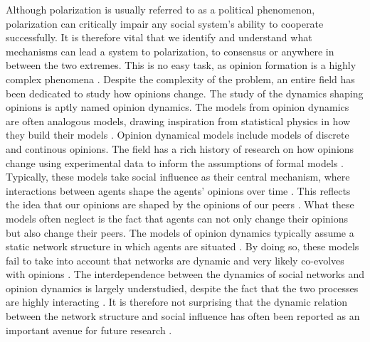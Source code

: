 \documentclass{article}
\begin{document}
Although polarization is usually referred to as a political phenomenon, polarization can critically impair any social system's ability to cooperate successfully. It is therefore vital that we identify and understand what mechanisms can lead a system to polarization, to consensus or anywhere in between the two extremes. This is no easy task, as opinion formation is a highly complex phenomena \cite{baumann_modeling_2021}. 
Despite the complexity of the problem, an entire field has been dedicated to study how opinions change. The study of the dynamics shaping opinions is aptly named opinion dynamics. The models from opinion dynamics are often analogous models, drawing inspiration from statistical physics in how they build their models \cite{galesic_integrating_2021}. Opinion dynamical models include models of discrete and continous opinions. The field has a rich history of research on how opinions change using experimental data to inform the assumptions of formal models \cite{baumann_modeling_2021,chacoma_opinion_2015,flache_models_2017,friedkin_social_1990,noorazar_classical_2020,spears_social_2021,turner_paths_2018}. Typically, these models take social influence as their central mechanism, where interactions between agents shape the agents’ opinions over time \cite{flache_models_2017}. 
This reflects the idea that our opinions are shaped by the opinions of our peers \cite{mcpherson_birds_2001}. What these models often neglect is the fact that agents can not only change their opinions but also change their peers. The models of opinion dynamics typically assume a static network structure in which agents are situated \cite{galesic_integrating_2021}. By doing so, these models fail to take into account that networks are dynamic and very likely co-evolves with opinions \cite{ferraz_de_arruda_modelling_2022,galesic_integrating_2021}. The interdependence between the dynamics of social networks and opinion dynamics is largely understudied, despite the fact that the two processes are highly interacting \cite{asikainen_cumulative_2020,bruch_agent-based_2015,galesic_integrating_2021,kossinets_origins_2009,noorazar_classical_2020}. It is therefore not surprising that the dynamic relation between the network structure and social influence has often been reported as an important avenue for future research \cite{flache_models_2017,galesic_integrating_2021}. 
\end{document}
